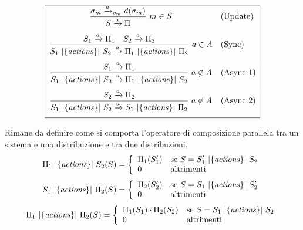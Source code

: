 $$
\begin{array}{|cl|}
	\hline
	\displaystyle{\frac{\sigma_m \xrightarrow{a}_{\rho_m} d(\sigma_m)}{S \xrightarrow{a} \Pi}\ m \in S} & \mbox{(Update)} \\[.5cm]
	\displaystyle{\frac{S_1 \xrightarrow{a} \Pi_1 \quad S_2 \xrightarrow{a} \Pi_2}{S_1 \mbox{ }|{\{\mathit{actions}\}}|\mbox{ }S_2 \xrightarrow{a} \Pi_1 \mbox{ }|{\{\mathit{actions}\}}|\mbox{ }\Pi_2}\ a \in A} & \mbox{(Sync)} \\[.5cm]
	\displaystyle{\frac{S_1 \xrightarrow{a} \Pi_1}{S_1 \mbox{ }|{\{\mathit{actions}\}}|\mbox{ }S_2 \xrightarrow{a} \Pi_1 \mbox{ }|{\{\mathit{actions}\}}|\mbox{ }S_2}\ a \not\in A} & \mbox{(Async\ 1)} \\[.5cm]
	\displaystyle{\frac{S_2 \xrightarrow{a} \Pi_2}{S_1 \mbox{ }|{\{\mathit{actions}\}}|\mbox{ }S_2 \xrightarrow{a} S_1 \mbox{ }|{\{\mathit{actions}\}}|\mbox{ }\Pi_2}\ a \not\in A} & \mbox{(Async\ 2)} \\[.5cm]
	\hline
\end{array}
$$

Rimane da definire come si comporta l'operatore di composizione parallela tra un sistema e una distribuzione e tra due distribuzioni.
$$
\Pi_1 \mbox{ }|{\{\mathit{actions}\}}|\mbox{ } S_2 (S) = \left\{
\begin{array}{ll}
	\Pi_1(S_1')	& \mbox{se } S = S_1' \mbox{ }|{\{\mathit{actions}\}}|\mbox{ } S_2 \\
	0			& \mbox{altrimenti} \\
\end{array}
\right.
$$
$$
S_1 \mbox{ }|{\{\mathit{actions}\}}|\mbox{ } \Pi_2 (S) = \left\{
\begin{array}{ll}
	\Pi_2(S_2')	& \mbox{se } S = S_1 \mbox{ }|{\{\mathit{actions}\}}|\mbox{ } S_2' \\
	0			& \mbox{altrimenti} \\
\end{array}
\right.
$$
$$
\Pi_1 \mbox{ }|{\{\mathit{actions}\}}|\mbox{ } \Pi_2 (S) = \left\{
\begin{array}{ll}
	\Pi_1(S_1)\cdot\Pi_2(S_2)	& \mbox{se } S = S_1 \mbox{ }|{\{\mathit{actions}\}}|\mbox{ } S_2 \\
	0			& \mbox{altrimenti} \\
\end{array}
\right.
$$


